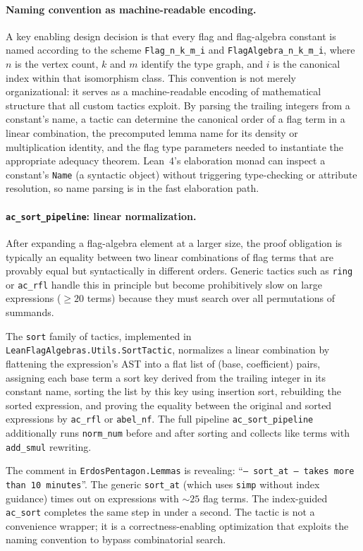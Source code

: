 \documentclass{article}
\newcommand{\lean}[1]{\texttt{#1}}
\begin{document}
\paragraph{Naming convention as machine-readable encoding.}
A key enabling design decision is that every flag and flag-algebra constant
is named according to the scheme \lean{Flag\_n\_k\_m\_i} and
\lean{FlagAlgebra\_n\_k\_m\_i}, where $n$ is the vertex count, $k$ and $m$
identify the type graph, and $i$ is the canonical index within that
isomorphism class.  This convention is not merely organizational: it serves
as a machine-readable encoding of mathematical structure that all custom
tactics exploit.  By parsing the trailing integers from a constant's name, a
tactic can determine the canonical order of a flag term in a linear
combination, the precomputed lemma name for its density or multiplication
identity, and the flag type parameters needed to instantiate the appropriate
adequacy theorem.  Lean~4's elaboration monad can inspect a constant's
\lean{Name} (a syntactic object) without triggering type-checking or
attribute resolution, so name parsing is in the fast elaboration path.

\paragraph{\lean{ac\_sort\_pipeline}: linear normalization.}
After expanding a flag-algebra element at a larger size, the proof obligation
is typically an equality between two linear combinations of flag terms that
are provably equal but syntactically in different orders.  Generic tactics
such as \lean{ring} or \lean{ac\_rfl} handle this in principle but become
prohibitively slow on large expressions ($\geq 20$ terms) because they must
search over all permutations of summands.

The \lean{sort} family of tactics, implemented in
\lean{LeanFlagAlgebras.Utils.SortTactic}, normalizes a linear combination by
flattening the expression's AST into a flat list of (base, coefficient)
pairs, assigning each base term a sort key derived from the trailing integer
in its constant name, sorting the list by this key using insertion sort,
rebuilding the sorted expression, and proving the equality between the
original and sorted expressions by \lean{ac\_rfl} or \lean{abel\_nf}.  The
full pipeline \lean{ac\_sort\_pipeline} additionally runs \lean{norm\_num}
before and after sorting and collects like terms with \lean{add\_smul}
rewriting.

The comment in \lean{ErdosPentagon.Lemmas} is revealing:
``\texttt{-- sort\_at -- takes more than 10 minutes}''.  The generic
\lean{sort\_at} (which uses \lean{simp} without index guidance) times out on
expressions with $\sim 25$ flag terms.  The index-guided \lean{ac\_sort}
completes the same step in under a second.  The tactic is not a convenience
wrapper; it is a correctness-enabling optimization that exploits the naming
convention to bypass combinatorial search.
\end{document}
